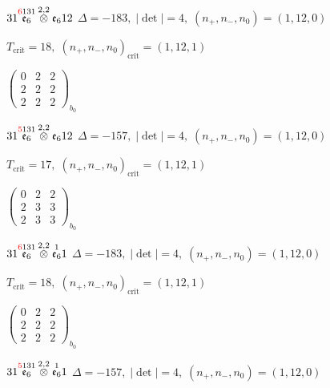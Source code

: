 \documentclass[10pt]{article}
\begin{document}
\smallskip

$31\overset{\textcolor{red}{6}131}{\mathfrak{e}_6}\overset{2,2}{\otimes}\mathfrak{e}_612$ \quad $\Delta=-183,\; |\det|=4,\; (n_+,n_-,n_0)=(1,12,0)$

\hspace{1em}$T_{\text{crit}}=18,\; (n_+,n_-,n_0)_{\text{crit}}=(1,12,1)$

\hspace{2em}$\left(\begin{smallmatrix}0 & 2 & 2 \\ 2 & 2 & 2 \\ 2 & 2 & 2\end{smallmatrix}\right)_{\!b_0}$

$31\overset{\textcolor{red}{5}131}{\mathfrak{e}_6}\overset{2,2}{\otimes}\mathfrak{e}_612$ \quad $\Delta=-157,\; |\det|=4,\; (n_+,n_-,n_0)=(1,12,0)$

\hspace{1em}$T_{\text{crit}}=17,\; (n_+,n_-,n_0)_{\text{crit}}=(1,12,1)$

\hspace{2em}$\left(\begin{smallmatrix}0 & 2 & 2 \\ 2 & 3 & 3 \\ 2 & 3 & 3\end{smallmatrix}\right)_{\!b_0}$

\smallskip

$31\overset{\textcolor{red}{6}131}{\mathfrak{e}_6}\overset{2,2}{\otimes}\overset{1}{\mathfrak{e}_6}1$ \quad $\Delta=-183,\; |\det|=4,\; (n_+,n_-,n_0)=(1,12,0)$

\hspace{1em}$T_{\text{crit}}=18,\; (n_+,n_-,n_0)_{\text{crit}}=(1,12,1)$

\hspace{2em}$\left(\begin{smallmatrix}0 & 2 & 2 \\ 2 & 2 & 2 \\ 2 & 2 & 2\end{smallmatrix}\right)_{\!b_0}$

$31\overset{\textcolor{red}{5}131}{\mathfrak{e}_6}\overset{2,2}{\otimes}\overset{1}{\mathfrak{e}_6}1$ \quad $\Delta=-157,\; |\det|=4,\; (n_+,n_-,n_0)=(1,12,0)$
\end{document}
